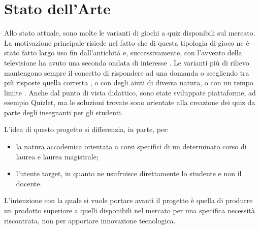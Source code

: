\section{Stato dell'Arte}
 Allo stato attuale, sono molte le varianti di giochi a quiz disponibili sul mercato. La motivazione principale risiede nel fatto che di questa tipologia di gioco ne è stato fatto largo uso fin dall'antichità \cite{quizgame} e, successivamente, con l'avvento della televisione ha avuto una seconda ondata di interesse \cite{gameshow}. Le varianti più di rilievo mantengono sempre il concetto di rispondere ad una domanda o scegliendo tra più risposte quella corretta \cite{whowantstobeamillionaire}, o con degli aiuti di diversa natura, o con un tempo limite \cite{jeopardy}. 
 Anche dal punto di vista didattico, sono state sviluppate piattaforme, ad esempio Quizlet\cite{quizlet}, ma le soluzioni trovate sono orientate alla creazione dei quiz da parte degli insegnanti per gli studenti.
 
 L'idea di questo progetto si differenzia, in parte, per: 
\begin{itemize}
    \item la natura accademica orientata a corsi specifici di un determinato corso di laurea e laurea magistrale;
    \item l'utente target, in quanto ne usufruisce direttamente lo studente e non il docente.
\end{itemize}
 
L'intenzione con la quale si vuole portare avanti il progetto è quella di produrre un prodotto superiore a quelli disponibili nel mercato per una specifica necessità riscontrata, non per apportare innovazione tecnologica.